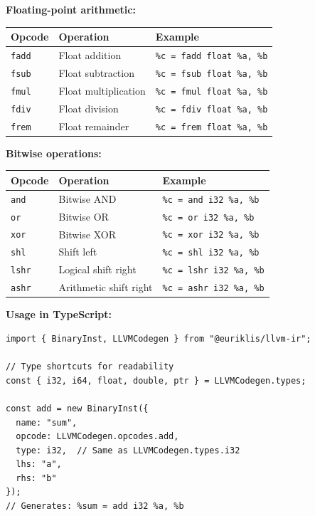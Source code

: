\documentclass[11pt]{article}
\begin{document}
\textbf{Floating-point arithmetic:}
\begin{center}
\begin{tabular}{|l|l|l|}
\hline
\textbf{Opcode} & \textbf{Operation} & \textbf{Example} \\
\hline
\texttt{fadd} & Float addition & \texttt{\%c = fadd float \%a, \%b} \\
\texttt{fsub} & Float subtraction & \texttt{\%c = fsub float \%a, \%b} \\
\texttt{fmul} & Float multiplication & \texttt{\%c = fmul float \%a, \%b} \\
\texttt{fdiv} & Float division & \texttt{\%c = fdiv float \%a, \%b} \\
\texttt{frem} & Float remainder & \texttt{\%c = frem float \%a, \%b} \\
\hline
\end{tabular}
\end{center}

\textbf{Bitwise operations:}
\begin{center}
\begin{tabular}{|l|l|l|}
\hline
\textbf{Opcode} & \textbf{Operation} & \textbf{Example} \\
\hline
\texttt{and} & Bitwise AND & \texttt{\%c = and i32 \%a, \%b} \\
\texttt{or} & Bitwise OR & \texttt{\%c = or i32 \%a, \%b} \\
\texttt{xor} & Bitwise XOR & \texttt{\%c = xor i32 \%a, \%b} \\
\texttt{shl} & Shift left & \texttt{\%c = shl i32 \%a, \%b} \\
\texttt{lshr} & Logical shift right & \texttt{\%c = lshr i32 \%a, \%b} \\
\texttt{ashr} & Arithmetic shift right & \texttt{\%c = ashr i32 \%a, \%b} \\
\hline
\end{tabular}
\end{center}

\textbf{Usage in TypeScript:}
\begin{lstlisting}[style=ts]
import { BinaryInst, LLVMCodegen } from "@euriklis/llvm-ir";

// Type shortcuts for readability
const { i32, i64, float, double, ptr } = LLVMCodegen.types;

const add = new BinaryInst({
  name: "sum",
  opcode: LLVMCodegen.opcodes.add,
  type: i32,  // Same as LLVMCodegen.types.i32
  lhs: "a",
  rhs: "b"
});
// Generates: %sum = add i32 %a, %b
\end{lstlisting}
\end{document}
